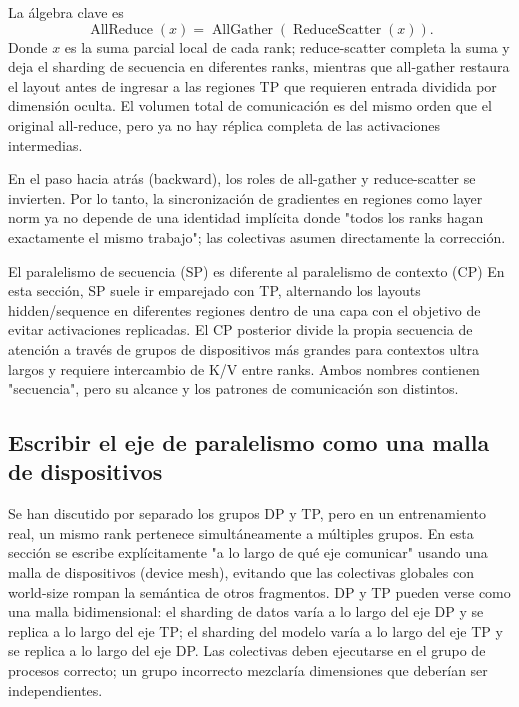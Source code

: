 La álgebra clave es
\[
\operatorname{AllReduce}(x)
=\operatorname{AllGather}(\operatorname{ReduceScatter}(x)).
\]
Donde $x$ es la suma parcial local de cada rank; reduce-scatter completa la suma y deja el sharding de secuencia en diferentes ranks, mientras que all-gather restaura el layout antes de ingresar a las regiones TP que requieren entrada dividida por dimensión oculta. El volumen total de comunicación es del mismo orden que el original all-reduce, pero ya no hay réplica completa de las activaciones intermedias.


En el paso hacia atrás (backward), los roles de all-gather y reduce-scatter se invierten. Por lo tanto, la sincronización de gradientes en regiones como layer norm ya no depende de una identidad implícita donde "todos los ranks hagan exactamente el mismo trabajo"; las colectivas asumen directamente la corrección.



\begin{warningbox}{El paralelismo de secuencia (SP) es diferente al paralelismo de contexto (CP)}
En esta sección, SP suele ir emparejado con TP, alternando los layouts hidden/sequence en diferentes regiones dentro de una capa con el objetivo de evitar activaciones replicadas. El CP posterior divide la propia secuencia de atención a través de grupos de dispositivos más grandes para contextos ultra largos y requiere intercambio de K/V entre ranks. Ambos nombres contienen "secuencia", pero su alcance y los patrones de comunicación son distintos.
\end{warningbox}

\subsection{Escribir el eje de paralelismo como una malla de dispositivos}

Se han discutido por separado los grupos DP y TP, pero en un entrenamiento real, un mismo rank pertenece simultáneamente a múltiples grupos. En esta sección se escribe explícitamente "a lo largo de qué eje comunicar" usando una malla de dispositivos (device mesh), evitando que las colectivas globales con world-size rompan la semántica de otros fragmentos. DP y TP pueden verse como una malla bidimensional: el sharding de datos varía a lo largo del eje DP y se replica a lo largo del eje TP; el sharding del modelo varía a lo largo del eje TP y se replica a lo largo del eje DP. Las colectivas deben ejecutarse en el grupo de procesos correcto; un grupo incorrecto mezclaría dimensiones que deberían ser independientes.

